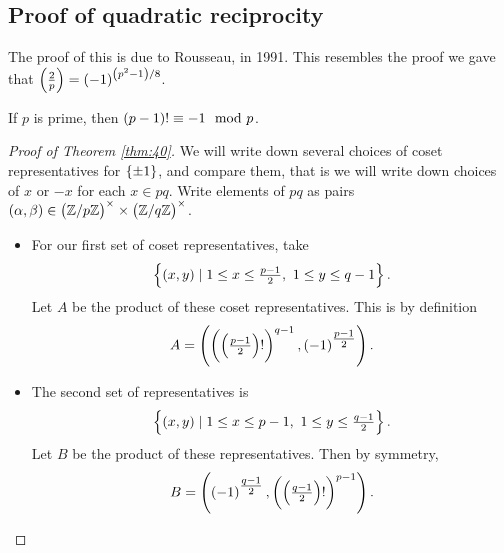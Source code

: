 \subsection{Proof of quadratic reciprocity}

The proof of this is due to Rousseau, in 1991. This resembles the proof we gave that $ \jacobi{2}{p} = \br{-1}^{\br{p^2 - 1} / 8} $.

\begin{theorem}
If $ p $ is prime, then $ \br{p - 1}! \equiv -1 \mod p $.
\end{theorem}

\begin{proof}[Proof of Theorem \ref{thm:40}]
We will write down several choices of coset representatives for $ \cbr{\pm 1} $, and compare them, that is we will write down choices of $ x $ or $ -x $ for each $ x \in \unit{pq} $. Write elements of $ \unit{pq} $ as pairs $ \br{\alpha, \beta} \in \unit{p} \times \unit{q} $.
\begin{itemize}
\item For our first set of coset representatives, take
$$ \cbr{\br{x, y} \mid 1 \le x \le \tfrac{p - 1}{2}, \ 1 \le y \le q - 1}. $$
Let $ A $ be the product of these coset representatives. This is by definition
$$ A = \br{\br{\br{\tfrac{p - 1}{2}}!}^{q - 1}, \br{-1}^{\tfrac{p - 1}{2}}}. $$
\item The second set of representatives is
$$ \cbr{\br{x, y} \mid 1 \le x \le p - 1, \ 1 \le y \le \tfrac{q - 1}{2}}. $$
Let $ B $ be the product of these representatives. Then by symmetry,
$$ B = \br{\br{-1}^{\tfrac{q - 1}{2}}, \br{\br{\tfrac{q - 1}{2}}!}^{p - 1}}. $$

\pagebreak


\end{itemize}
\end{proof}

